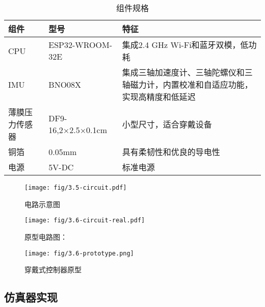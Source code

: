\begin{table}[b]
    \centering
    \caption{\label{tab:hardware}组件规格}
    \begin{tabular}{>{\raggedright\arraybackslash}p{2.5cm} p{4cm} p{4cm}}
        \toprule
        \textbf{组件} & \textbf{型号}        & \textbf{特征}                                                  \\
        \midrule
        CPU         & ESP32-WROOM-32E    & 集成2.4 GHz Wi-Fi和蓝牙双模，低功耗                                   \\ \midrule
        IMU       & BNO08X             & 集成三轴加速度计、三轴陀螺仪和三轴磁力计，内置校准和自适应功能，实现高精度和低延迟                 \\ \midrule
        薄膜压力传感器     & DF9-16,2×2.5×0.1cm & 小型尺寸，适合穿戴设备                                                \\ \midrule
        铜箔          & 0.05mm             & 具有柔韧性和优良的导电性                                               \\ \midrule
        电源          & 5V-DC              & 标准电源                                                         \\
        \bottomrule
    \end{tabular}
\end{table}

\begin{figure}
    \centering
    \texttt{[image: fig/3.5-circuit.pdf]}
    \caption{电路示意图}
    \label{fig:3.5-circuit}
\end{figure}

\begin{figure}
    \vspace{-10pt}
    \texttt{[image:  fig/3.6-circuit-real.pdf]}
    \caption{原型电路图：}
    \label{fig:4.2-1-circuit}
    \vspace{-20pt}
\end{figure}



\begin{figure}[htbp]
    \centering
    \texttt{[image:  fig/3.6-prototype.png]}
    \caption{穿戴式控制器原型}
    \label{fig:4.2-2-prototype}
\end{figure}

\clearpage

\subsection{仿真器实现}


